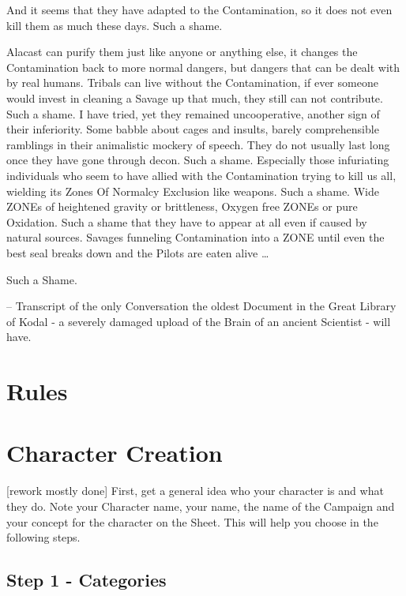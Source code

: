 \documentclass{book}
\begin{document}
    And it seems that they have adapted to the Contamination, so it does not even kill
    them as much these days.
    Such a shame. \par
    Alacast can purify them just like anyone or anything else,
    it changes the Contamination back to more normal dangers, but dangers that can be dealt with by real humans.
    Tribals can live without the Contamination,
    if ever someone would invest in cleaning a Savage up that much, they still can not contribute.
    Such a shame.
    I have tried, yet they remained uncooperative, another sign of their inferiority.
    Some babble about cages and insults, barely comprehensible ramblings in their animalistic mockery of
    speech.
    They do not usually last long once they have gone through decon.
    Such a shame.
    Especially those infuriating individuals who seem to have allied with the Contamination trying to kill us all,
    wielding its Zones Of Normalcy Exclusion like weapons.
    Such a shame.
    Wide ZONEs of heightened gravity or brittleness, Oxygen free ZONEs or pure Oxidation.
    Such a shame that they have to appear at all even if caused by natural sources.
    Savages funneling Contamination into a ZONE  until even the best seal breaks down and the Pilots are eaten alive
    \ldots \par Such a Shame. \par \vspace{1cm}
    -- Transcript of the only Conversation the oldest Document in the Great Library of Kodal - a severely damaged
    upload of the Brain of an ancient Scientist - will have.\newpage

    \section{Rules}\label{sec:rules}
    

    \section{Character Creation}
    [rework mostly done]\label{sec:characterCreation}
    First, get a general idea who your character is and what they do.
    Note your Character name, your name, the name of the
    Campaign and your concept for the character on the Sheet.
    This will help you choose in the following steps.

    \subsection{Step 1 - Categories}\label{subsec:step1-Categories}
\end{document}
